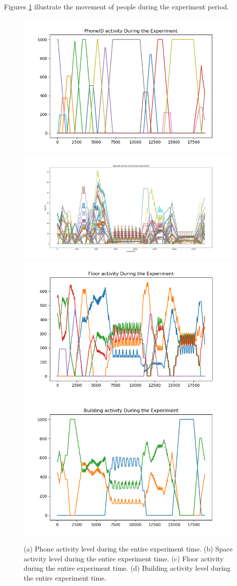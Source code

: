 Figures \ref{alltogether} illustrate the movement of people during the experiment period. 







\begin{figure}
    \centering
        \includegraphics[width = 7 cm]{image/Chapters/Chapter6/phoneTime.png}\hfill
        \includegraphics[width = 7 cm]{image/Chapters/Chapter6/spaceidAccumulat.png}\hfill
        \includegraphics[width = 7 cm]{image/Chapters/Chapter6/floorTime.png}\hfill
        \includegraphics[width = 7 cm]{image/Chapters/Chapter6/buildingTime.png}
    \caption{(a) Phone activity level during the entire experiment time. (b) Space activity level during the entire experiment time. (c) Floor activity during the entire experiment time. (d) Building activity level during the entire experiment time.}
    \label{alltogether}
\end{figure}




